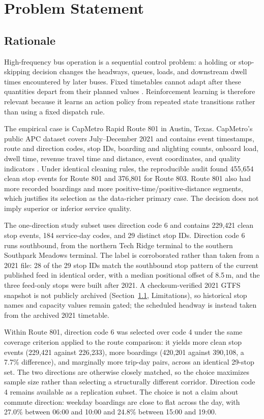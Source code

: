 \chapter{Problem Statement}

\section{Rationale}\label{sec:rationale}

High-frequency bus operation is a sequential control problem: a holding or stop-skipping decision changes the headways, queues, loads, and downstream dwell times encountered by later buses. Fixed timetables cannot adapt after these quantities depart from their planned values \cite{Ceder2007,Daganzo2009}. Reinforcement learning is therefore relevant because it learns an action policy from repeated state transitions rather than using a fixed dispatch rule.

The empirical case is CapMetro Rapid Route 801 in Austin, Texas. CapMetro's public APC dataset covers July--December 2021 and contains event timestamps, route and direction codes, stop IDs, boarding and alighting counts, onboard load, dwell time, revenue travel time and distance, event coordinates, and quality indicators \cite{TexasCapMetroAPC2021}. Under identical cleaning rules, the reproducible audit found 455{,}654 clean stop events for Route 801 and 376{,}801 for Route 803. Route 801 also had more recorded boardings and more positive-time/positive-distance segments, which justifies its selection as the data-richer primary case. The decision does not imply superior or inferior service quality.

The one-direction study subset uses direction code 6 and contains 229{,}421 clean stop events, 184 service-day codes, and 29 distinct stop IDs. Direction code 6 runs southbound, from the northern Tech Ridge terminal to the southern Southpark Meadows terminal. The label is corroborated rather than taken from a 2021 file: 28 of the 29 stop IDs match the southbound stop pattern of the current published feed in identical order, with a median positional offset of 8.5\,m, and the three feed-only stops were built after 2021. A checksum-verified 2021 GTFS snapshot is not publicly archived (Section~\ref{sec:rationale}, Limitations), so historical stop names and capacity values remain gated; the scheduled headway is instead taken from the archived 2021 timetable.

Within Route 801, direction code 6 was selected over code 4 under the same coverage criterion applied to the route comparison: it yields more clean stop events (229{,}421 against 226{,}233), more boardings (420{,}201 against 390{,}108, a 7.7\% difference), and marginally more trip-day pairs, across an identical 29-stop set. The two directions are otherwise closely matched, so the choice maximizes sample size rather than selecting a structurally different corridor. Direction code 4 remains available as a replication subset. The choice is not a claim about commute direction: weekday boardings are close to flat across the day, with 27.0\% between 06:00 and 10:00 and 24.8\% between 15:00 and 19:00.

